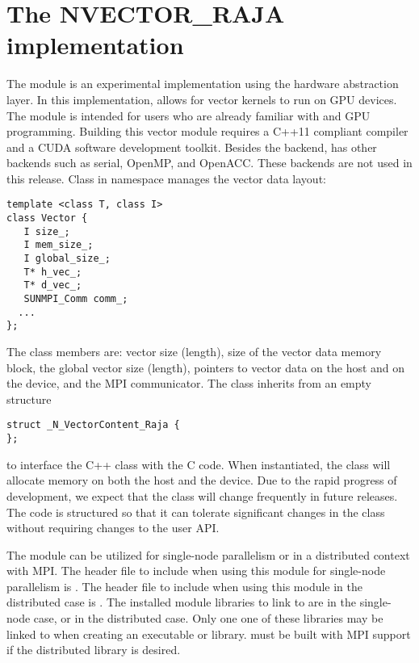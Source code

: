 %
\section{The NVECTOR\_RAJA implementation}\label{ss:nvec_raja}

The {\nvecraja} module is an experimental {\nvector} implementation using the
\href{https://software.llnl.gov/RAJA/}{\raja} hardware abstraction layer.
In this implementation, {\raja}
allows for {\sundials} vector kernels to run on GPU devices. The module is intended for users
who are already familiar with {\raja} and GPU programming. Building this vector
module requires a C++11 compliant compiler and a CUDA software development toolkit.
Besides the {\cuda} backend, {\raja} has other backends such as serial, OpenMP,
and OpenACC. These backends are not used in this {\sundials} release.
Class  in namespace  manages the vector data layout:
\begin{verbatim}
template <class T, class I>
class Vector {
   I size_;
   I mem_size_;
   I global_size_;
   T* h_vec_;
   T* d_vec_;
   SUNMPI_Comm comm_;
  ...
};
\end{verbatim}
The class members are: vector size (length), size of the vector data
memory block, the global vector size (length), pointers to vector data
on the host and on the device, and the MPI communicator. The class
 inherits from an empty structure
\begin{verbatim}
struct _N_VectorContent_Raja {
};
\end{verbatim}
to interface the C++ class with the {\nvector} C code. When instantiated, the class
 will allocate memory on both the host and the device. Due to the rapid
progress of {\raja} development, we expect that the 
class will change frequently in future {\sundials} releases. The code is
structured so that it can tolerate significant changes in the
 class without requiring changes to the user API.


The {\nvecraja} module can be utilized for single-node parallelism or in a distributed context with MPI.
The header file to include when using this module for single-node parallelism is .
The header file to include when using this module in the distributed case is .
The installed module libraries to link to are  in the single-node case, or  in the distributed case. Only one one of these libraries may be linked to when creating an executable or library. {\sundials} must be built with
MPI support if the distributed library is desired.

